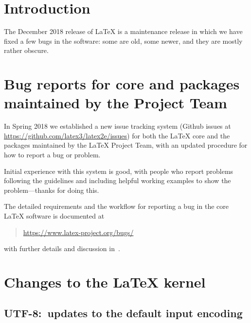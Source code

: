 \documentclass{ltnews}
\begin{document}

\maketitle
\tableofcontents

\setlength{}

\bigskip

\section{Introduction}

The December 2018 release of \LaTeX{} is a maintenance release in
which we have fixed a few bugs in the software: some are old, some
newer, and they are mostly rather obscure.

\section[Bug reports for core \LaTeXe{} and packages]
        {Bug reports for core \LaTeXe{} and packages maintained by the Project Team}

In Spring 2018 we established a new issue tracking system
(Github issues at \url{https://github.com/latex3/latex2e/issues}) for both
the \LaTeX{} core and the packages maintained by the
\LaTeX{} Project Team, with an updated procedure for how to report a
bug or problem.

Initial experience with this system is good, with people who report
problems following the guidelines and including helpful working
examples to show the problem---thanks for doing this.

The detailed requirements and the workflow for reporting a bug in the
core \LaTeX{} software is documented at
\begin{quote}
\url{https://www.latex-project.org/bugs/}
\end{quote}
with further details and discussion in~\cite{29:Mittelbach:TB39-1}.


\section{Changes to the \LaTeX{} kernel}

\subsection{UTF-8:\ updates to the default input encoding}
\end{document}
